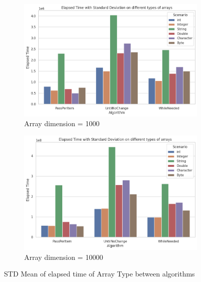 \documentclass{article}
\begin{document}
\begin{figure}[H]
    \centering
    \begin{subfigure}[b]{0.48\textwidth}
        \centering
        \includegraphics[width=\textwidth]{./data/std_type_array_1000.png}
        \caption{Array dimension = 1000}
    \end{subfigure}
    \hfill
    \begin{subfigure}[b]{0.48\textwidth}
        \centering
        \includegraphics[width=\textwidth]{./data/std_type_array_10000.png}
        \caption{Array dimension = 10000}
    \end{subfigure}
    \caption{STD Mean of elapsed time of Array Type between algorithms}
\end{figure}
\end{document}
